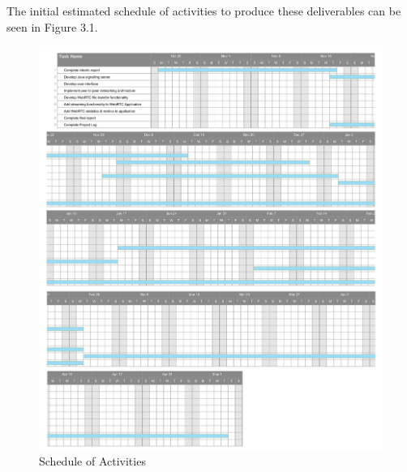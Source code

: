 \documentclass[]{report}
\begin{document}
	The initial estimated schedule of activities to produce these deliverables can be seen in Figure 3.1.
	\newpage
	\begin{figure}[h!]
		\caption{Schedule of Activities}
		\includegraphics[scale=0.5]{ganttchart.png}
	\end{figure}
	\newpage	
	
\end{document}
